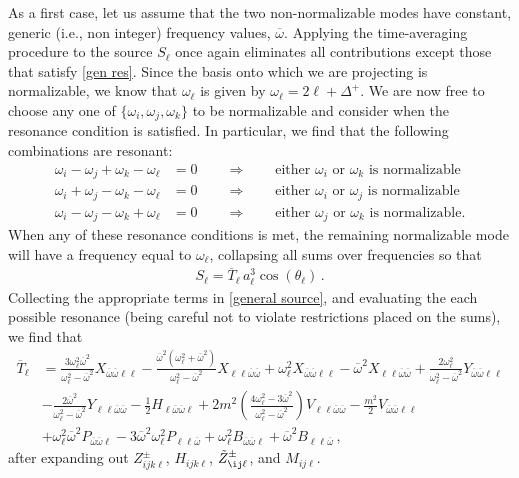 \documentclass[letterpaper,11pt]{article}
\newcommand{\oi}{\omega_i}
\newcommand{\oj}{\omega_j}
\newcommand{\ok}{\omega_k}
\newcommand{\ol}{\omega_\ell}
\newcommand{\thl}{\theta_\ell}
\newcommand{\ob}{\overline{\omega}}
\begin{document}
As a first case, let us assume that the two non-normalizable modes have constant, generic (i.e., non integer) frequency values, $\ob$. Applying the time-averaging procedure to the source $S_\ell$ once again eliminates all contributions except those that satisfy \eqref{gen res}. Since the basis onto which we are projecting is normalizable, we know that $\omega_\ell$ is given by $\omega_\ell = 2\ell + \Delta^{+}$. We are now free to choose any one of $\{\omega_i, \omega_j, \ok\}$ to be normalizable and consider when the resonance condition is satisfied. In particular, we find that the following combinations are resonant:
\begin{align}
\oi - \oj + \ok - \ol &= 0 \qquad \Rightarrow \qquad \text{either $\oi$ or $\ok$ is normalizable} \\
\oi + \oj - \ok - \ol &= 0 \qquad \Rightarrow \qquad \text{either $\oi$ or $\oj$ is normalizable} \\
\oi - \oj - \ok + \ol &= 0 \qquad \Rightarrow \qquad \text{either $\oj$ or $\ok$ is normalizable.}
\end{align}
When any of these resonance conditions is met, the remaining normalizable mode will have a frequency equal to $\ol$, collapsing all sums over frequencies so that
\begin{align}
S_\ell = \overline{T}_\ell \, a_\ell^3 \cos (\thl) \, .
\end{align}
Collecting the appropriate terms in \eqref{general source}, and evaluating the each possible resonance (being careful not to violate restrictions placed on the sums), we find that
\begin{align}
\overline{T}_\ell &= \frac{3 \ol^2 \ob^2}{\ol^2 - \ob^2} X_{\ob \ob \ell \ell} - \frac{\ob^2 (\ol^2 + \ob^2)}{\ol^2 -\ob^2} X_{\ell \ell \ob \ob} + \ol^2 X_{\ob \ob \ell \ell} - \ob^2 X_{\ell \ell \ob \ob} + \frac{2 \ol^2}{\ol^2 - \ob^2} Y_{\ob \ob \ell \ell} \nonumber \\
\quad & - \frac{2 \ob^2}{\ol^2 - \ob^2} Y_{\ell \ell \ob \ob} - \frac{1}{2} H_{\ell \ob \ob \ell} + 2m^2 \left( \frac{4 \ol^2 - 3 \ob^2}{\ol^2 - \ob^2}  \right) V_{\ell \ell \ob \ob}  - \frac{m^2}{2} V_{\ob \ob \ell \ell} \nonumber \\
\quad & + \ol^2 \ob^2 P_{\ob \ob \ell} - 3 \ob^2 \ol^2 P_{\ell \ell \ob} + \ol^2 B_{\ob \ob \ell} + \ob^2 B_{\ell \ell \ob} \, ,
\end{align}
after expanding out $Z^{\pm}_{ijk\ell}$, $H_{ijk\ell}$, $\tilde{Z}^{\pm}_{\ij\ell}$, and $M_{ij\ell}$.
\end{document}
